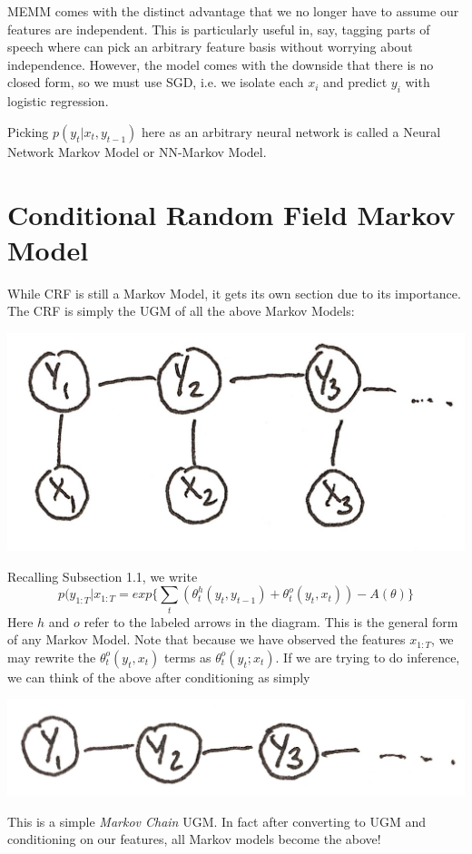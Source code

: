 \documentclass{article}
\newcommand{\T}{\theta}
\begin{document}
MEMM comes with the distinct advantage that we no longer have to assume our features are independent. This is particularly useful in, say, tagging parts of speech where can pick an arbitrary feature basis without worrying about independence. However, the model comes with the downside that there is no closed form, so we must use SGD, i.e. we isolate each $x_i$ and predict $y_i$ with logistic regression.

Picking $p(y_t|x_t,y_{t-1})$ here as an arbitrary neural network is called a Neural Network Markov Model or NN-Markov Model. 
\section{Conditional Random Field Markov Model}
While CRF is still a Markov Model, it gets its own section due to its importance. The CRF is simply the UGM of all the above Markov Models:
\begin{center}
\includegraphics[scale=.1]{CRF} 
\end{center}
Recalling Subsection 1.1, we write
\[
p(y_{1:T}|x_{1:T} = exp\{\sum\limits_{t}(\theta_t^h(y_t,y_{t-1})+\theta_t^o(y_t,x_t)) - A(\theta) \}
\]
Here $h$ and $o$ refer to the labeled arrows in the diagram.
This is the general form of any Markov Model. Note that because we have observed the features $x_{1:T}$, we may rewrite the $\T_t^o(y_t,x_t)$ terms as $\theta_t^o(y_t;x_t)$. If we are trying to do inference, we can think of the above after conditioning as simply
\begin{center}
\includegraphics[scale=.1]{M_chain} 
\end{center}
This is a simple \textit{Markov Chain} UGM. In fact after converting to UGM and conditioning on our features, all Markov models become the above! 
\end{document}
